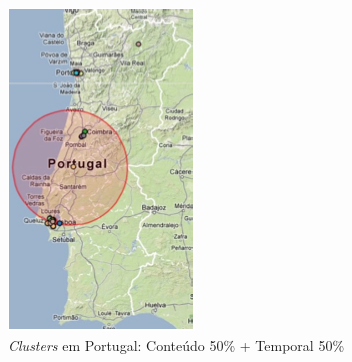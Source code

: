 \begin{figure}[h]
\begin{subfigure}[b]{.2\textwidth}
  \includegraphics[width=1\linewidth]{./figures/tweeprofiles/extp3}
  \caption{\textit{Clusters} em Portugal: Conteúdo 50\% + Temporal 50\%}
  \label{fig:sfig3}
\end{subfigure}
\quad
\begin{subfigure}[b]{.2\textwidth}
  \centering

\end{subfigure}
\end{figure}
